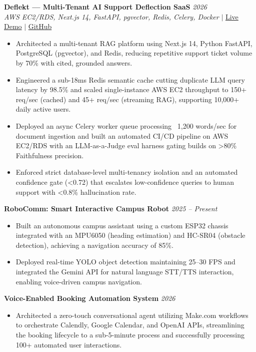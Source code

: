 \documentclass[11pt, a4paper]{article}
\begin{document}
\textbf{Deflekt — Multi-Tenant AI Support Deflection SaaS} \hfill \textit{2026} \\
\textit{AWS EC2/RDS, Next.js 14, FastAPI, pgvector, Redis, Celery, Docker} $|$ \href{http://54.208.178.218/}{Live Demo} $|$ \href{https://github.com/SShayanHussain/deflekt}{GitHub}
\begin{itemize}[leftmargin=0.25in, itemsep=2pt]
    \item Architected a multi-tenant RAG platform using Next.js 14, Python FastAPI, PostgreSQL (pgvector), and Redis, reducing repetitive support ticket volume by 70\% with cited, grounded answers.
    \item Engineered a sub-18ms Redis semantic cache cutting duplicate LLM query latency by 98.5\% and scaled single-instance AWS EC2 throughput to 150+ req/sec (cached) and 45+ req/sec (streaming RAG), supporting 10,000+ daily active users.
    \item Deployed an async Celery worker queue processing ~1,200 words/sec for document ingestion and built an automated CI/CD pipeline on AWS EC2/RDS with an LLM-as-a-Judge eval harness gating builds on >80\% Faithfulness precision.
    \item Enforced strict database-level multi-tenancy isolation and an automated confidence gate (<0.72) that escalates low-confidence queries to human support with <0.8\% hallucination rate.
\end{itemize}

\textbf{RoboComm: Smart Interactive Campus Robot} \hfill \textit{2025 -- Present}
\begin{itemize}[leftmargin=0.25in, itemsep=2pt]
    \item Built an autonomous campus assistant using a custom ESP32 chassis integrated with an MPU6050 (heading estimation) and HC-SR04 (obstacle detection), achieving a navigation accuracy of 85\%.
    \item Deployed real-time YOLO object detection maintaining 25--30 FPS and integrated the Gemini API for natural language STT/TTS interaction, enabling voice-driven campus navigation.
\end{itemize}

\textbf{Voice-Enabled Booking Automation System} \hfill \textit{2026}
\begin{itemize}[leftmargin=0.25in, itemsep=2pt]
    \item Architected a zero-touch conversational agent utilizing Make.com workflows to orchestrate Calendly, Google Calendar, and OpenAI APIs, streamlining the booking lifecycle to a sub-5-minute process and successfully processing 100+ automated user interactions.
\end{itemize}
\end{document}
